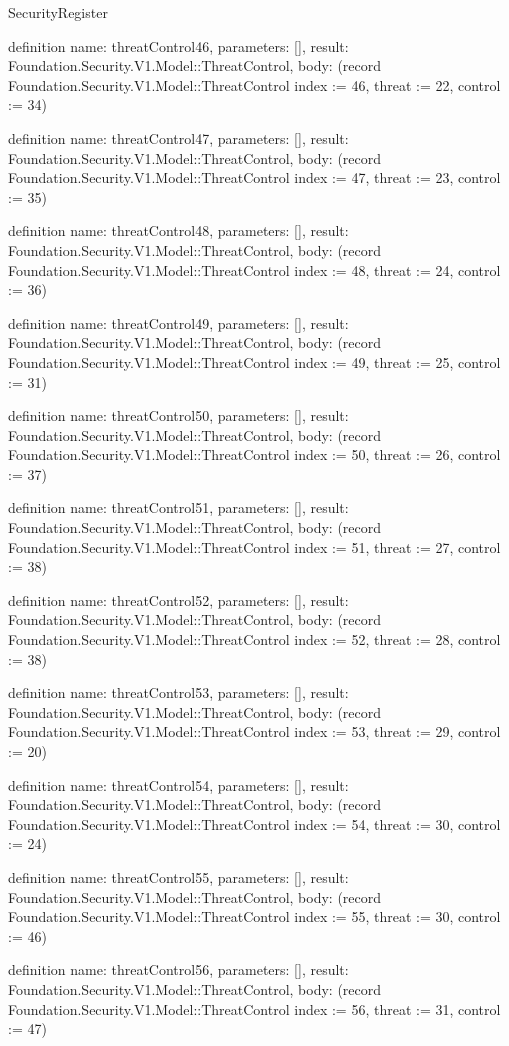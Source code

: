 \begin{lexlean}{SecurityRegister}
\begin{semanticmodule}
definition{
  name: threatControl46,
  parameters: [],
  result: Foundation.Security.V1.Model::ThreatControl,
  body: (record Foundation.Security.V1.Model::ThreatControl {index := 46, threat := 22, control := 34})
}

definition{
  name: threatControl47,
  parameters: [],
  result: Foundation.Security.V1.Model::ThreatControl,
  body: (record Foundation.Security.V1.Model::ThreatControl {index := 47, threat := 23, control := 35})
}

definition{
  name: threatControl48,
  parameters: [],
  result: Foundation.Security.V1.Model::ThreatControl,
  body: (record Foundation.Security.V1.Model::ThreatControl {index := 48, threat := 24, control := 36})
}

definition{
  name: threatControl49,
  parameters: [],
  result: Foundation.Security.V1.Model::ThreatControl,
  body: (record Foundation.Security.V1.Model::ThreatControl {index := 49, threat := 25, control := 31})
}

definition{
  name: threatControl50,
  parameters: [],
  result: Foundation.Security.V1.Model::ThreatControl,
  body: (record Foundation.Security.V1.Model::ThreatControl {index := 50, threat := 26, control := 37})
}

definition{
  name: threatControl51,
  parameters: [],
  result: Foundation.Security.V1.Model::ThreatControl,
  body: (record Foundation.Security.V1.Model::ThreatControl {index := 51, threat := 27, control := 38})
}

definition{
  name: threatControl52,
  parameters: [],
  result: Foundation.Security.V1.Model::ThreatControl,
  body: (record Foundation.Security.V1.Model::ThreatControl {index := 52, threat := 28, control := 38})
}

definition{
  name: threatControl53,
  parameters: [],
  result: Foundation.Security.V1.Model::ThreatControl,
  body: (record Foundation.Security.V1.Model::ThreatControl {index := 53, threat := 29, control := 20})
}

definition{
  name: threatControl54,
  parameters: [],
  result: Foundation.Security.V1.Model::ThreatControl,
  body: (record Foundation.Security.V1.Model::ThreatControl {index := 54, threat := 30, control := 24})
}

definition{
  name: threatControl55,
  parameters: [],
  result: Foundation.Security.V1.Model::ThreatControl,
  body: (record Foundation.Security.V1.Model::ThreatControl {index := 55, threat := 30, control := 46})
}

definition{
  name: threatControl56,
  parameters: [],
  result: Foundation.Security.V1.Model::ThreatControl,
  body: (record Foundation.Security.V1.Model::ThreatControl {index := 56, threat := 31, control := 47})
}


\end{semanticmodule}
\end{lexlean}
